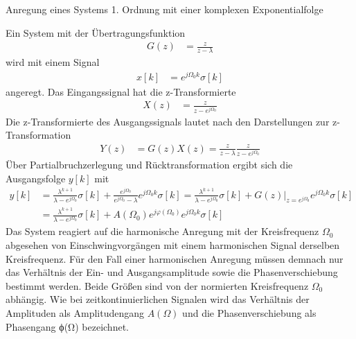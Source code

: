 \begin{example}{Anregung eines Systems 1. Ordnung mit einer komplexen Exponentialfolge}
\label{example:beispiel-anregung-eines-systems-1.-ordnung-mit-einer-komplexen-exponentialfolge}

Ein System mit der Übertragungsfunktion
\begin{align*}
G(z) &= \frac{z}{z - \lambda} 
\end{align*}
wird mit einem Signal
\begin{align*}
x[ k] &= e^{j  \Omega_{0}  k}  \sigma[ k] 
\end{align*}
angeregt. Das Eingangssignal hat die z-Transformierte
\begin{align*}
X(z) &= \frac{z}{z - e^{j  \Omega_{0}}} 
\end{align*}
Die z-Transformierte des Ausgangssignals lautet nach den Darstellungen zur z-Transformation
\begin{align*}
Y(z) &= G(z)  X(z) = \frac{z}{z - \lambda}  \frac{z}{z - e^{j  \Omega_{0}}} 
\end{align*}
Über Partialbruchzerlegung und Rücktransformation ergibt sich die Ausgangsfolge \(y[k]\) mit
\begin{align*}
{y\left[k\right]} &=  {\frac{\lambda ^{k+1} }{\lambda -e^{j \Omega _{0} } }  \sigma \left[k\right]+\frac{e^{j \Omega _{0} } }{e^{j \Omega _{0} } -\lambda }  e^{j \Omega _{0}  k}  \sigma \left[k\right]=\frac{\lambda ^{k+1} }{\lambda -e^{j \Omega _{0} } }  \sigma \left[k\right]+\left. G\left(z\right)\right|_{z=e^{j \Omega _{0} } }  e^{j \Omega _{0}  k}  \sigma \left[k\right]} \\
{} &=  {\frac{\lambda ^{k+1} }{\lambda -e^{j \Omega _{0} } }  \sigma \left[k\right]+A\left(\Omega _{0} \right) e^{j \varphi \left(\Omega _{0} \right)}  e^{j \Omega _{0}  k}  \sigma \left[k\right]}
\end{align*}
Das System reagiert auf die harmonische Anregung mit der Kreisfrequenz \(Ω_{0}\) abgesehen von Einschwingvorgängen mit einem harmonischen Signal derselben Kreisfrequenz. Für den Fall einer harmonischen Anregung müssen demnach nur das Verhältnis der Ein- und Ausgangsamplitude sowie die Phasenverschiebung bestimmt werden. Beide Größen sind von der normierten Kreisfrequenz \(Ω_{0}\) abhängig. Wie bei zeitkontinuierlichen Signalen wird das Verhältnis der Amplituden als Amplitudengang \(A(Ω)\) und die Phasenverschiebung als Phasengang ϕ(Ω) bezeichnet.

\end{example}

